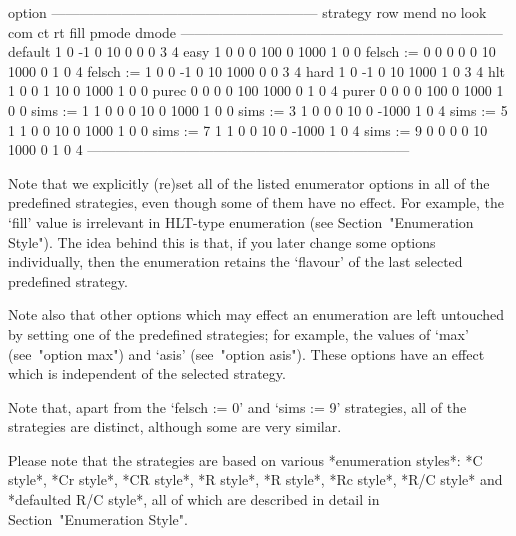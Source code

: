 \begintt
                               option
            ---------------------------------------------------------
strategy    row  mend  no  look  com    ct     rt  fill  pmode  dmode
---------------------------------------------------------------------
default       1     0  -1     0   10     0      0     0      3      4
easy          1     0   0     0  100     0   1000     1      0      0
felsch := 0   0     0   0     0   10  1000      0     1      0      4
felsch := 1   0     0  -1     0   10  1000      0     0      3      4
hard          1     0  -1     0   10  1000      1     0      3      4
hlt           1     0   0     1   10     0   1000     1      0      0
purec         0     0   0     0  100  1000      0     1      0      4
purer         0     0   0     0  100     0   1000     1      0      0
sims := 1     1     0   0     0   10     0   1000     1      0      0
sims := 3     1     0   0     0   10     0  -1000     1      0      4
sims := 5     1     1   0     0   10     0   1000     1      0      0
sims := 7     1     1   0     0   10     0  -1000     1      0      4
sims := 9     0     0   0     0   10  1000      0     1      0      4
---------------------------------------------------------------------
\endtt

Note that we explicitly (re)set all of the listed  enumerator  options
in all of the predefined strategies, even though some of them have  no
effect. For example,  the  `fill'  value  is  irrelevant  in  HLT-type
enumeration (see Section~"Enumeration Style"). The idea behind this is
that,  if  you  later  change  some  options  individually,  then  the
enumeration retains the \lq{}flavour' of the last selected  predefined
strategy.

Note also that other options which may effect an enumeration are  left
untouched by setting one of the predefined  strategies;  for  example,
the values of `max' (see~"option max") and `asis' (see~"option asis").
These options have an effect which  is  independent  of  the  selected
strategy.

Note that, apart from the `felsch := 0' and `sims  :=  9'  strategies,
all of the strategies are distinct, although some are very similar.


Please note that the strategies  are  based  on  various  *enumeration
styles*: *C style*, *Cr style*, *CR style*, *R  style*,  *R\*  style*,
*Rc style*, *R/C style* and *defaulted R/C style*, all  of  which  are
described in detail in Section~"Enumeration Style".

